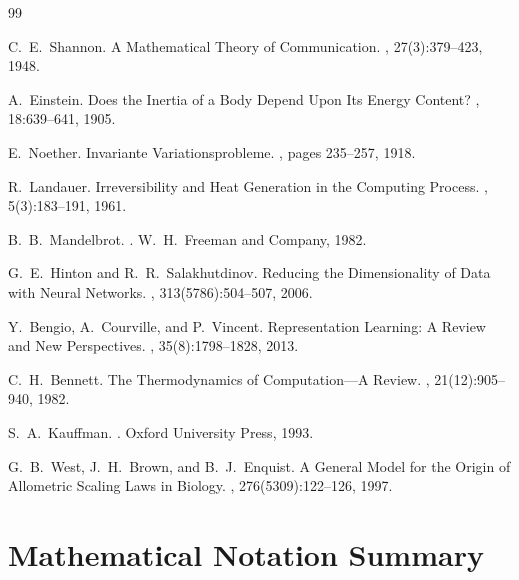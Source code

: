 \documentclass[11pt,a4paper]{article}
\begin{document}

\begin{thebibliography}{99}

C.~E.~Shannon.
\newblock A Mathematical Theory of Communication.
, 27(3):379--423, 1948.

A.~Einstein.
\newblock Does the Inertia of a Body Depend Upon Its Energy Content?
, 18:639--641, 1905.

E.~Noether.
\newblock Invariante Variationsprobleme.
, pages 235--257, 1918.

R.~Landauer.
\newblock Irreversibility and Heat Generation in the Computing Process.
, 5(3):183--191, 1961.

B.~B.~Mandelbrot.
.
\newblock W.~H.~Freeman and Company, 1982.

G.~E.~Hinton and R.~R.~Salakhutdinov.
\newblock Reducing the Dimensionality of Data with Neural Networks.
, 313(5786):504--507, 2006.

Y.~Bengio, A.~Courville, and P.~Vincent.
\newblock Representation Learning: A Review and New Perspectives.
, 35(8):1798--1828, 2013.

C.~H.~Bennett.
\newblock The Thermodynamics of Computation---A Review.
, 21(12):905--940, 1982.

S.~A.~Kauffman.
.
\newblock Oxford University Press, 1993.

G.~B.~West, J.~H.~Brown, and B.~J.~Enquist.
\newblock A General Model for the Origin of Allometric Scaling Laws in Biology.
, 276(5309):122--126, 1997.

\end{thebibliography}

\appendix

\section{Mathematical Notation Summary}
\end{document}
